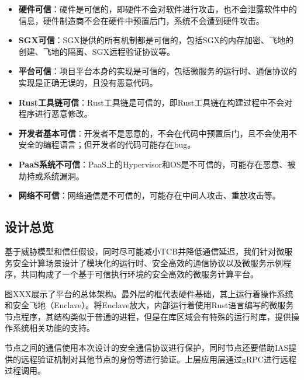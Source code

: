 \begin{itemize}
    \item \textbf{硬件可信}：硬件是可信的，即硬件不会对软件进行攻击，也不会泄露软件中的信息，硬件制造商不会在硬件中预置后门，系统不会遭到硬件攻击。
    \item \textbf{SGX可信}：SGX提供的所有机制都是可信的，包括SGX的内存加密、飞地的创建、飞地的隔离、SGX远程验证协议等。
    \item \textbf{平台可信}：项目平台本身的实现是可信的，包括微服务的运行时、通信协议的实现是正确无误的，且没有恶意代码。
    \item \textbf{Rust工具链可信}：Rust工具链是可信的，即Rust工具链在构建过程中不会对程序进行恶意修改。
    \item \textbf{开发者基本可信}：开发者不是恶意的，不会在代码中预置后门，且不会使用不安全的编程语言；但开发者的代码可能存在bug。
    \item \textbf{PaaS系统不可信}：PaaS上的Hypervisor和OS是不可信的，可能存在恶意、被劫持或系统漏洞。
    \item \textbf{网络不可信}：网络通信是不可信的，可能存在中间人攻击、重放攻击等。
\end{itemize}

\subsection{设计总览}

基于威胁模型和信任假设，同时尽可能减小TCB并降低通信延迟，我们针对微服务安全计算场景设计了模块化的运行时、安全高效的通信协议以及微服务示例程序，共同构成了一个基于可信执行环境的安全高效的微服务计算平台。


图XXX展示了平台的总体架构。最外层的框代表硬件基础，其上运行着操作系统和安全飞地（Enclave）。将Enclave放大，内部运行着使用Rust语言编写的微服务节点程序，其结构类似于普通的进程，但是在库区域会有特殊的运行时库，提供操作系统相关功能的支持。

节点之间的通信使用本次设计的安全通信协议进行保护，同时节点还要借助IAS提供的远程验证机制对其他节点的身份等进行验证。上层应用层通过gRPC进行远程过程调用。

